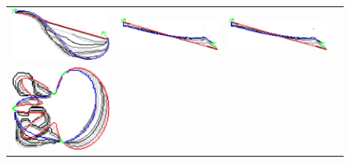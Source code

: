 \begin{figure}
\begin{tabular}{cccc}
\includegraphics[scale=0.2]{figures/chapter9/constrained-elastica/localsearch/curve-3/len_pen-0.0002/radius-15/nc-4/h1.0/summary.pdf} &
\includegraphics[scale=0.2]{figures/chapter9/constrained-elastica/graphflow/curve-3/len_pen-0.002/radius-15/N-1/h1.0/summary.pdf} &
\includegraphics[scale=0.25]{figures/chapter9/constrained-elastica/graphflow/curve-3/len_pen-0.0002/radius-15/N-1/h1.0/summary.pdf}\\
\includegraphics[scale=0.2]{figures/chapter9/constrained-elastica/localsearch/flower-1/len_pen-0.002/radius-15/nc-4/h1.0/summary.pdf} &

\end{tabular}
\end{figure}
